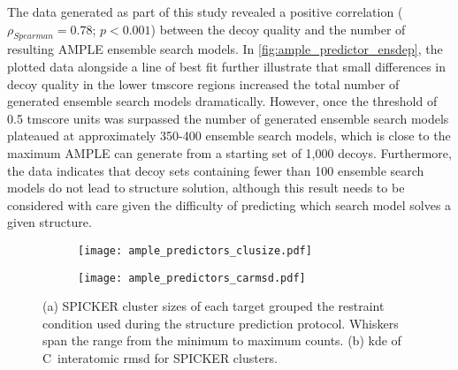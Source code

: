 The data generated as part of this study revealed a positive correlation ($\rho_{Spearman}=0.78$; $p<0.001$) between the decoy quality and the number of resulting AMPLE ensemble search models. In \cref{fig:ample_predictor_ensdep}, the plotted data alongside a line of best fit further illustrate that small differences in decoy quality in the lower \gls{tmscore} regions increased the total number of generated ensemble search models dramatically. However, once the threshold of 0.5 \gls{tmscore} units was surpassed the number of generated ensemble search models plateaued at approximately 350-400 ensemble search models, which is close to the maximum AMPLE can generate from a starting set of 1,000 decoys. Furthermore, the data indicates that decoy sets containing fewer than 100 ensemble search models do not lead to structure solution, although this result needs to be considered with care given the difficulty of predicting which search model solves a given structure.

\begin{figure}[H]
    \begin{subfigure}[b]{\textwidth}
        \centering
        \texttt{[image: ample\_predictors\_clusize.pdf]}
        \caption{}
        \label{fig:ample_predictor_clusize}
    \end{subfigure}

    \begin{subfigure}[b]{\textwidth}
        \centering
        \texttt{[image: ample\_predictors\_carmsd.pdf]}
        \caption{}
        \label{fig:ample_predictor_carmsd}
    \end{subfigure}
    \caption[Effects of decoy sets on SPICKER clustering]{(a) SPICKER cluster sizes of each target grouped the restraint condition used during the structure prediction protocol. Whiskers span the range from the minimum to maximum counts. (b) \Gls{kde} of C\textalpha\ interatomic \gls{rmsd} for SPICKER clusters.}
\end{figure}

